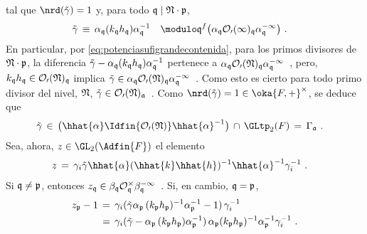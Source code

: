 tal que $\nrd(\tilde{\gamma})=1$ y, para todo
$\frak{q}\mid\frak{N}\cdot\frak{p}$,
\begin{align*}
	\tilde{\gamma} & \,\equiv\,\alpha_{\frak{q}}
		(k_{\frak{q}}h_{\frak{q}})\alpha_{\frak{q}}^{-1}
		\quad\modulo \frak{q}^{f}\big(\alpha_{\frak{q}}
			\cal{O}_{0}(1)_{\frak{q}}\alpha_{\frak{q}}^{-1}
			\big)
	\text{ .}
\end{align*}
%
En particular, por \eqref{eq:potenciasufigrandecontenida}, para los primos
divisores de $\frak{N}\cdot\frak{p}$, la diferencia
\begin{math}
	\tilde{\gamma}-\alpha_{\frak{q}}
		(k_{\frak{q}}h_{\frak{q}})\alpha_{\frak{q}}^{-1}
\end{math}
pertenece a
\begin{math}
	\alpha_{\frak{q}}\cal{O}_{0}(\frak{N})_{\frak{q}}
		\alpha_{\frak{q}}^{-1}
\end{math}~,
pero, $k_{\frak{q}}h_{\frak{q}}\in\cal{O}_{0}(\frak{N})_{\frak{q}}$ implica
\begin{math}
	\tilde{\gamma}\in\alpha_{\frak{q}}
		\cal{O}_{0}(\frak{N})_{\frak{q}}\alpha_{\frak{q}}^{-1}
\end{math}~.
Como esto es cierto para todo primo divisor del nivel, $\frak{N}$,
\begin{math}
	\tilde{\gamma}\in\cal{O}_{0}(\frak{N})_{\frak{a}}
\end{math}~.
Como $\nrd(\tilde{\gamma})=1\in\oka{F,+}^{\times}$, se deduce que
\begin{align*}
	\tilde{\gamma} & \,\in\,\big(\hhat{\alpha}
		\Idfin{\cal{O}_{0}(\frak{N})}\hhat{\alpha}^{-1}\big)
		\,\cap\,\GLtp_{2}(F) \,=\,\Gamma_{\frak{a}}
	\text{ .}
\end{align*}
%
Sea, ahora, $z\in\GL_{2}(\Adfin{F})$ el elemento
\begin{align*}
	z & \,=\,\gamma_{i}\tilde{\gamma}\hhat{\alpha}
		(\hhat{k}\hhat{h})^{-1}\hhat{\alpha}^{-1}
			\gamma_{i}^{-1}
	\text{ .}
\end{align*}
%
Si $\frak{q}\not =\frak{p}$, entonces
\begin{math}
	z_{\frak{q}}\in\beta_{\frak{q}}\cal{O}^{\times}_{\frak{q}}
		\beta_{\frak{q}}^{-1}
\end{math}~.
Si, en cambio, $\frak{q}=\frak{p}$,
\begin{align*}
	z_{\frak{p}}-1 & \,=\,\gamma_{i}(\tilde{\gamma}
		\alpha_{\frak{p}}\,(k_{\frak{p}}h_{\frak{p}})^{-1}
		\alpha_{\frak{p}}^{-1} - 1)\,\gamma_{i}^{-1} \\
	& \,=\,\gamma_{i} (\tilde{\gamma}-
			\alpha_{\frak{p}}\,(k_{\frak{p}}h_{\frak{p}})
			\alpha_{\frak{p}}^{-1}) \,
		\alpha_{\frak{p}}(k_{\frak{p}}h_{\frak{p}})^{-1}
		\alpha_{\frak{p}}^{-1}\gamma_{i}^{-1}
	\text{ .}
\end{align*}
